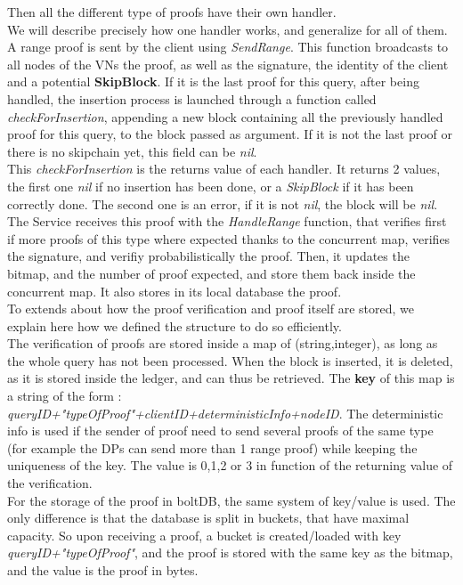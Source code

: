 \documentclass{article}
\begin{document}
Then all the different type of proofs have their own handler.\\
We will describe precisely how one handler works, and generalize for all of them.\\

A range proof is sent by the client using \textit{SendRange}. This function broadcasts to all nodes of the VNs the proof, as well as the signature, the identity of the client and a potential \textbf{SkipBlock}. If it is the last proof for this query, after being handled, the insertion process is launched through a function called \textit{checkForInsertion}, appending a new block containing all the previously handled proof for this query, to the block passed as argument. If it is not the last proof or there is no skipchain yet, this field can be \textit{nil}.\\
This \textit{checkForInsertion} is the returns value of each handler. It returns 2 values, the first one \textit{nil} if no insertion has been done, or a \textit{SkipBlock} if it has been correctly done. The second one is an error, if it is not \textit{nil}, the block will be \textit{nil}.\\

The Service receives this proof with the \textit{HandleRange} function, that verifies first if more proofs of this type where expected thanks to the concurrent map, verifies the signature, and verifiy probabilistically the proof. Then, it updates the bitmap, and the number of proof expected, and store them back inside the concurrent map. It also stores in its local database the proof.\\

To extends about how the proof verification and proof itself are stored, we explain here how we defined the structure to do so efficiently.\\
The verification of proofs are stored inside a map of (string,integer), as long as the whole query has not been processed. When the block is inserted, it is deleted, as it is stored inside  the ledger, and can thus be retrieved. The \textbf{key} of this map is a string of the form : \textit{queryID+"typeOfProof"+clientID+deterministicInfo+nodeID}. The deterministic info is used if the sender of proof need to send several proofs of the same type (for example the DPs can send more than 1 range proof) while keeping the uniqueness of the key. The value is 0,1,2 or 3 in function of the returning value of the verification.\\
For the storage of the proof in boltDB, the same system of key/value is used. The only difference is that the database is split in buckets, that  have maximal capacity. So upon receiving a proof, a bucket is created/loaded with key \textit{queryID+"typeOfProof"}, and the proof is stored with the same key as the bitmap, and the value is the proof in bytes.\\
\end{document}
